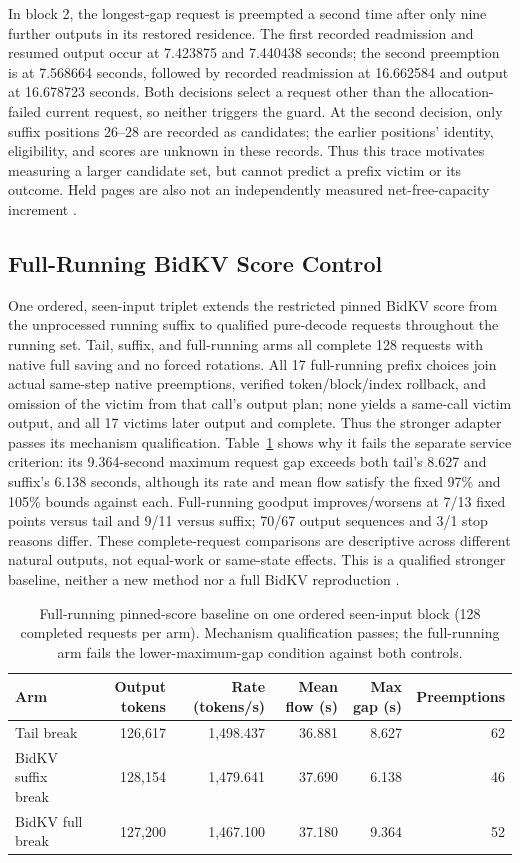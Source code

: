 \documentclass[10pt]{article}
\begin{document}
In block 2, the longest-gap request is preempted a second time after only nine further outputs in its restored residence. The first recorded readmission and resumed output occur at 7.423875 and 7.440438 seconds; the second preemption is at 7.568664 seconds, followed by recorded readmission at 16.662584 and output at 16.678723 seconds. Both decisions select a request other than the allocation-failed current request, so neither triggers the guard. At the second decision, only suffix positions 26--28 are recorded as candidates; the earlier positions' identity, eligibility, and scores are unknown in these records. Thus this trace motivates measuring a larger candidate set, but cannot predict a prefix victim or its outcome. Held pages are also not an independently measured net-free-capacity increment \cite{guardfreshchainb2}.

\subsection{Full-Running BidKV Score Control}
One ordered, seen-input triplet extends the restricted pinned BidKV score from the unprocessed running suffix to qualified pure-decode requests throughout the running set. Tail, suffix, and full-running arms all complete 128 requests with native full saving and no forced rotations. All 17 full-running prefix choices join actual same-step native preemptions, verified token/block/index rollback, and omission of the victim from that call's output plan; none yields a same-call victim output, and all 17 victims later output and complete. Thus the stronger adapter passes its mechanism qualification. Table~\ref{tab:bidkvfullrunning} shows why it fails the separate service criterion: its 9.364-second maximum request gap exceeds both tail's 8.627 and suffix's 6.138 seconds, although its rate and mean flow satisfy the fixed 97\% and 105\% bounds against each. Full-running goodput improves/worsens at 7/13 fixed points versus tail and 9/11 versus suffix; 70/67 output sequences and 3/1 stop reasons differ. These complete-request comparisons are descriptive across different natural outputs, not equal-work or same-state effects. This is a qualified stronger baseline, neither a new method nor a full BidKV reproduction \cite{bidkvcode,bidkvfullrunning}.

\begin{table}[t]
\centering\small
\caption{Full-running pinned-score baseline on one ordered seen-input block (128 completed requests per arm). Mechanism qualification passes; the full-running arm fails the lower-maximum-gap condition against both controls.}
\label{tab:bidkvfullrunning}
\begin{tabular}{lrrrrr}
\toprule
Arm & Output tokens & Rate (tokens/s) & Mean flow (s) & Max gap (s) & Preemptions \\
\midrule
Tail break & 126,617 & 1,498.437 & 36.881 & 8.627 & 62 \\
BidKV suffix break & 128,154 & 1,479.641 & 37.690 & 6.138 & 46 \\
BidKV full break & 127,200 & 1,467.100 & 37.180 & 9.364 & 52 \\
\bottomrule
\end{tabular}
\end{table}
\end{document}

